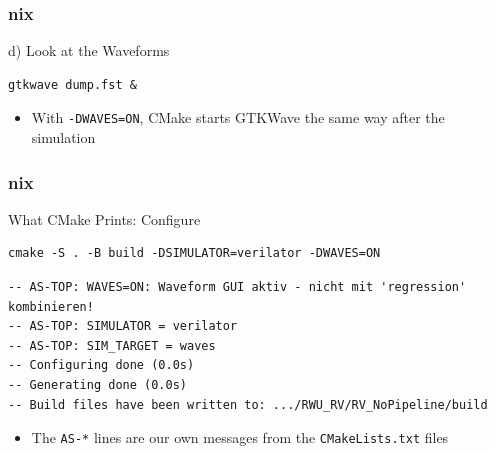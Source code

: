 \documentclass{beamer}
\newcommand{\astitle}{nix}
\newcommand{\assubtitle}{nix}
\newcommand{\cmd}[1]{\texttt{#1}}
\begin{document}
\renewcommand{\assubtitle}{d) Look at the Waveforms}
\begin{frame}[fragile]
\frametitle{\astitle}
\begin{block}{\assubtitle}
\begin{lstlisting}[style=sh,basicstyle=\ttfamily\small]
gtkwave dump.fst &
\end{lstlisting}
  \begin{itemize}
    \item With \cmd{-DWAVES=ON}, CMake starts GTKWave the same way after the simulation
  \end{itemize}
\end{block}
\end{frame}

\renewcommand{\assubtitle}{What CMake Prints: Configure}
\begin{frame}[fragile]
\frametitle{\astitle}
\begin{block}{\assubtitle}
\begin{lstlisting}[style=sh]
cmake -S . -B build -DSIMULATOR=verilator -DWAVES=ON
\end{lstlisting}
\begin{lstlisting}[style=out]
-- AS-TOP: WAVES=ON: Waveform GUI aktiv - nicht mit 'regression' kombinieren!
-- AS-TOP: SIMULATOR = verilator
-- AS-TOP: SIM_TARGET = waves
-- Configuring done (0.0s)
-- Generating done (0.0s)
-- Build files have been written to: .../RWU_RV/RV_NoPipeline/build
\end{lstlisting}
  \begin{itemize}
    \item The \cmd{AS-*} lines are our own messages from the \cmd{CMakeLists.txt} files
  \end{itemize}
\end{block}
\end{frame}
\end{document}
